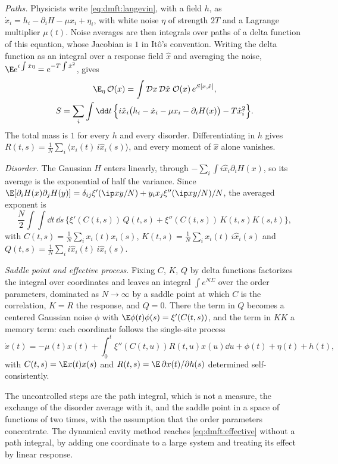 \begin{refsection}
\begin{heuristic}
\emph{Paths.} Physicists write \eqref{eq:dmft:langevin}, with a field $h$, as $\dot x_i=h_i-\partial_iH-\mu x_i+\eta_i$, with white noise $\eta$ of strength $2T$ and a Lagrange multiplier $\mu(t)$. Noise averages are then integrals over paths of a delta function of this equation, whose Jacobian is $1$ in Itô's convention. Writing the delta function as an integral over a response field $\hat x$ and averaging the noise, $\E e^{i\int\hat x\eta}=e^{-T\int\hat x^2}$, gives
\begin{gather*}
\E_\eta\,\mathcal O(x)=\int\mathcal Dx\,\mathcal D\hat x\;\mathcal O(x)\,e^{S[x,\hat x]},\\
S=\sum_i\int\dd t\,\Bigl\{i\hat x_i\bigl(h_i-\dot x_i-\mu x_i-\partial_iH(x)\bigr)-T\hat x_i^2\Bigr\}.
\end{gather*}
The total mass is $1$ for every $h$ and every disorder. Differentiating in $h$ gives $R(t,s)=\frac1N\sum_i\langle x_i(t)\,i\hat x_i(s)\rangle$, and every moment of $\hat x$ alone vanishes.

\emph{Disorder.} The Gaussian $H$ enters linearly, through $-\sum_i\int i\hat x_i\partial_iH(x)$, so its average is the exponential of half the variance. Since $\E[\partial_iH(x)\partial_jH(y)]=\delta_{ij}\xi'(\ip xy/N)+y_ix_j\xi''(\ip xy/N)/N$, the averaged exponent is
\[
\frac N2\int\!\!\int\dd t\,\dd s\,\bigl\{\xi'(C(t,s))\,Q(t,s)+\xi''(C(t,s))\,K(t,s)K(s,t)\bigr\},
\]
with $C(t,s)=\frac1N\sum_ix_i(t)x_i(s)$, $K(t,s)=\frac1N\sum_ix_i(t)\,i\hat x_i(s)$ and $Q(t,s)=\frac1N\sum_ii\hat x_i(t)\,i\hat x_i(s)$.

\emph{Saddle point and effective process.} Fixing $C$, $K$, $Q$ by delta functions factorizes the integral over coordinates and leaves an integral $\int e^{N\Sigma}$ over the order parameters, dominated as $N\to\infty$ by a saddle point at which $C$ is the correlation, $K=R$ the response, and $Q=0$. There the term in $Q$ becomes a centered Gaussian noise $\phi$ with $\E\phi(t)\phi(s)=\xi'(C(t,s))$, and the term in $KK$ a memory term: each coordinate follows the single-site process
\begin{equation}\label{eq:dmft:effective}
\dot x(t)=-\mu(t)x(t)+\int_0^t\xi''(C(t,u))R(t,u)x(u)\dd u+\phi(t)+\eta(t)+h(t),
\end{equation}
with $C(t,s)=\E x(t)x(s)$ and $R(t,s)=\E\,\partial x(t)/\partial h(s)$ determined self-consistently.
\end{heuristic}

The uncontrolled steps are the path integral, which is not a measure, the exchange of the disorder average with it, and the saddle point in a space of functions of two times, with the assumption that the order parameters concentrate. The dynamical cavity method reaches \eqref{eq:dmft:effective} without a path integral, by adding one coordinate to a large system and treating its effect by linear response.


\end{refsection}
